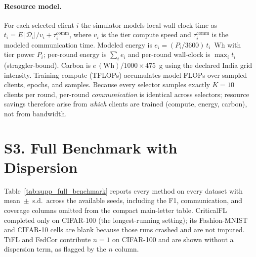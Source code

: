 \documentclass[10pt]{article}
\begin{document}
\paragraph{Resource model.} For each selected client $i$ the simulator models local wall-clock time as $t_i = E\,|\mathcal{D}_i|/v_i + \tau^{\text{comm}}_i$, where $v_i$ is the tier compute speed and $\tau^{\text{comm}}_i$ is the modeled communication time. Modeled energy is $e_i = (P_i/3600)\,t_i$~Wh with tier power $P_i$; per-round energy is $\sum_i e_i$ and per-round wall-clock is $\max_i t_i$ (straggler-bound). Carbon is $e\,(\text{Wh})/1000 \times 475$~g using the declared India grid intensity. Training compute (TFLOPs) accumulates model FLOPs over sampled clients, epochs, and samples. Because every selector samples exactly $K=10$ clients per round, per-round \emph{communication} is identical across selectors; resource savings therefore arise from \emph{which} clients are trained (compute, energy, carbon), not from bandwidth.

\section*{S3. Full Benchmark with Dispersion}

Table~\ref{tab:supp_full_benchmark} reports every method on every dataset with mean~$\pm$~s.d.\ across the available seeds, including the F1, communication, and coverage columns omitted from the compact main-letter table. CriticalFL completed only on CIFAR-100 (the longest-running setting); its Fashion-MNIST and CIFAR-10 cells are blank because those runs crashed and are not imputed. TiFL and FedCor contribute $n=1$ on CIFAR-100 and are shown without a dispersion term, as flagged by the $n$ column.
\end{document}
